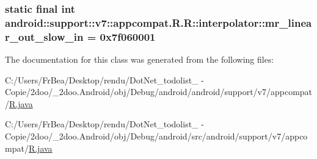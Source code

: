 \hypertarget{classandroid_1_1support_1_1v7_1_1appcompat_1_1_r_1_1interpolator_ba755f548f835e271ce7ba885989fb6b}{
\subsubsection[{mr\_\-linear\_\-out\_\-slow\_\-in}]{\setlength{\rightskip}{0pt plus 5cm}static final int android::support::v7::appcompat.R.R::interpolator::mr\_\-linear\_\-out\_\-slow\_\-in = 0x7f060001}}
\label{classandroid_1_1support_1_1v7_1_1appcompat_1_1_r_1_1interpolator_ba755f548f835e271ce7ba885989fb6b}




The documentation for this class was generated from the following files:\begin{CompactItemize}
\item 
C:/Users/FrBea/Desktop/rendu/DotNet\_\-todolist\_ - Copie/2doo/\_\-2doo.Android/obj/Debug/android/android/support/v7/appcompat/\hyperlink{android_2support_2v7_2appcompat_2_r_8java}{R.java}\item 
C:/Users/FrBea/Desktop/rendu/DotNet\_\-todolist\_ - Copie/2doo/\_\-2doo.Android/obj/Debug/android/src/android/support/v7/appcompat/\hyperlink{src_2android_2support_2v7_2appcompat_2_r_8java}{R.java}\end{CompactItemize}
